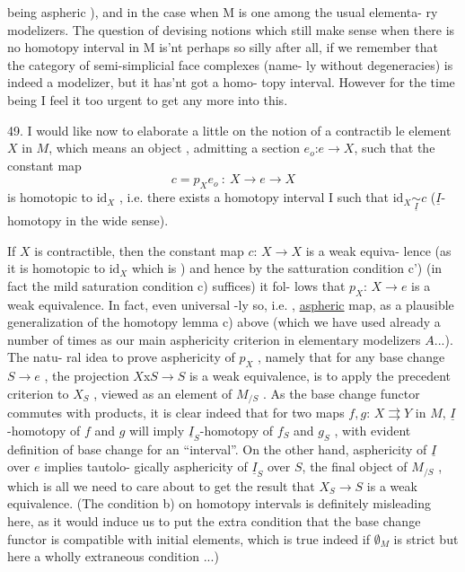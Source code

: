 being aspheric ),  and in the case when M is one among the usual elementa-%
ry modelizers.  The question of devising notions which still make sense
when there is no homotopy interval in M is'nt perhaps so silly after all,
if we remember that the category of semi-simplicial face complexes (name-%
ly without degeneracies) is indeed a modelizer,  but it has'nt got a homo-%
topy interval.  However for the time being I feel it  too urgent to
\margin{$\lfloor$} get any more into this.

\margin{$\lceil$} 49.   I would like now to elaborate a little on the notion of a contractib
le element  $X$ in $M$,  which  means an object ,  admitting a section $e_o$:$e\to X$,
such that the constant map
\[ c = p_X e_o \ :\ X \to e \to X \]
is  homotopic to $\mathrm{id}_X$  ,  i.e. there exists a homotopy interval I such that
$\mathrm{id}_X \underset{\underline{I}}{\sim} c$  ($\underline{I}$-homotopy in the wide sense).

If $X$ is contractible,  then the constant map $c$: $X\to X$ is a weak equiva-%
lence (as it is homotopic to $\mathrm{id}_X$ which is )  and hence by the satturation
condition c') (in fact the mild saturation condition c) suffices) it fol-%
lows that $p_X$: $X\to e$ is a weak equivalence.  In fact,   even universal
-ly so,  i.e. ,   \uline{aspheric} map,  as a plausible generalization of the
homotopy lemma c)  above (which we have used already a number of times as
our main asphericity criterion in elementary modelizers $A\hat{}$...).  The natu-%
ral idea to prove asphericity of $p_X$ ,  namely that for any base change
$S\to e$ ,  the projection  $X$x$S\to S$ is a weak equivalence,  is to apply
the precedent criterion  to $X_S$ , viewed as an element of $M_{/S}$ .  As the
base change functor commutes with products,  it is clear indeed that
for two maps $f,g$:  $X \rightrightarrows Y$  in $M$,  $\underline{I}$-homotopy of $f$ and $g$ will imply
$\underline{I}_S$-homotopy of $f_S$ and $g_S$ ,  with evident definition of base change for an
``interval''.  On the other hand,  asphericity of $\underline{I}$ over $e$ implies tautolo-%
gically asphericity of $\underline{I}_S$ over $S$,  the final object of $M_{/S}$ ,  which is all
we need to care about to get the result that $X_S\to S$ is a weak equivalence.
(The condition b) on homotopy intervals is definitely misleading here,  as
it would induce us to put the extra condition that the base change functor
is compatible with initial elements,  which is true indeed if $\emptyset_M$ is strict\hand{,}
but here a wholly extraneous condition ...)

